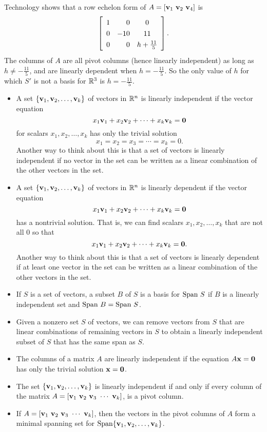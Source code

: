 \begin{example}
\item Technology shows that a row echelon form of $A = [\mathbf{v}_1 \ \mathbf{v}_2 \ \mathbf{v}_4]$ is 
\[\left[ \renewcommand{\arraystretch}{1.3} \begin{array}{crc} 1&0&0 \\ 0&-10&11 \\ 0&0&h+\frac{11}{5} \end{array} \right].\]
The columns of $A$ are all pivot columns (hence linearly independent) as long as $h \neq -\frac{11}{5}$, and are linearly dependent when $h = -\frac{11}{5}$. So the only value of $h$ for which $S'$ is not a basis for $\mathbb{R}^3$ is $h = -\frac{11}{5}$. 

\ea

\end{example}

\label{sec:indep_summ}

\begin{itemize}
\item A set $\{\mathbf{v}_1, \mathbf{v}_2, \ldots, \mathbf{v}_k\}$ of vectors in $\mathbb{R}^n$ is linearly independent if the vector equation
\[x_1 \mathbf{v}_1 + x_2 \mathbf{v}_2 + \cdots + x_k \mathbf{v}_k = \mathbf{0}\]
for scalars $x_1, x_2, \ldots, x_k$ has only the trivial solution
\[x_1 = x_2 = x_3 = \cdots = x_k = 0.\]
Another way to think about this is that a set of vectors is linearly independent if no vector in the set can be written as a linear combination of the other vectors in the set.
\item A set $\{\mathbf{v}_1, \mathbf{v}_2, \ldots, \mathbf{v}_k\}$ of vectors in $\mathbb{R}^n$ is linearly dependent if the vector equation
\[x_1 \mathbf{v}_1 + x_2 \mathbf{v}_2 + \cdots + x_k \mathbf{v}_k = \mathbf{0}\]
has a nontrivial solution. That is, we can find scalars $x_1, x_2, \ldots, x_k$ that are not all 0 so that
\[x_1 \mathbf{v}_1 + x_2 \mathbf{v}_2 + \cdots + x_k \mathbf{v}_k = \mathbf{0}.\]
Another way to think about this is that a set of vectors is linearly dependent if at least one vector in the set can be written as a linear combination of the other vectors in the set.
\item If $S$ is a set of vectors, a subset $B$ of $S$ is a basis for $\text{Span} \ S$ if $B$ is a linearly independent set and $\text{Span} \ B = \text{Span} \ S$. 
\item Given a nonzero set $S$ of vectors, we can remove vectors from $S$ that are linear combinations of remaining vectors in $S$ to obtain a linearly independent subset of $S$ that has the same span as $S$.
\item The columns of a matrix $A$ are linearly independent if the equation $A \mathbf{x} = \mathbf{0}$ has only the trivial solution $\mathbf{x} = \mathbf{0}$.
\item The set $\{\mathbf{v}_1, \mathbf{v}_2, \ldots, \mathbf{v}_k\}$ is linearly independent if and only if every column of the matrix $A = [\vv_1 \ \vv_2 \ \vv_3 \ \cdots \ \vv_k]$, is a pivot column.
\item If $A = [\vv_1 \ \vv_2 \ \vv_3 \ \cdots \ \vv_k]$, then the vectors in the pivot columns of $A$ form a minimal spanning set for $\text{Span} \{\mathbf{v}_1, \mathbf{v}_2, \ldots, \mathbf{v}_k\}$.
\end{itemize}




